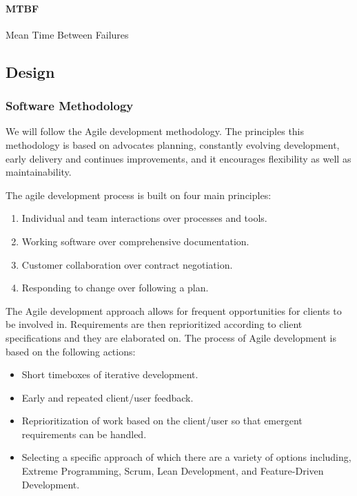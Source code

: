 			\paragraph{MTBF} Mean Time Between Failures

\subsection{Design}

	\subsubsection{Software Methodology}
	We will follow the Agile development methodology. The principles this methodology is based on advocates planning, constantly evolving development, early delivery and continues improvements, and it encourages flexibility as well as maintainability.

	\begin{flushleft}
	The agile development process is built on four main principles:
		\begin{enumerate}
			\item Individual and team interactions over processes and tools.
			\item Working software over comprehensive documentation.
			\item Customer collaboration over contract negotiation.
			\item Responding to change over following a plan.
		\end{enumerate}
	\end{flushleft}

\begin{flushleft}

The Agile development approach allows for frequent opportunities for clients to be involved in. Requirements are then reprioritized according to client specifications and they are elaborated on. The process of Agile development is based on the following actions:

\end{flushleft}

    \begin{itemize}
			\item Short timeboxes of iterative development.
			\item Early and repeated client/user feedback.
			\item Reprioritization of work based on the client/user so that emergent requirements can be handled.
			\item Selecting a specific approach of which there are a variety of options including, Extreme Programming, Scrum, Lean Development, and Feature-Driven Development.
		\end{itemize}


